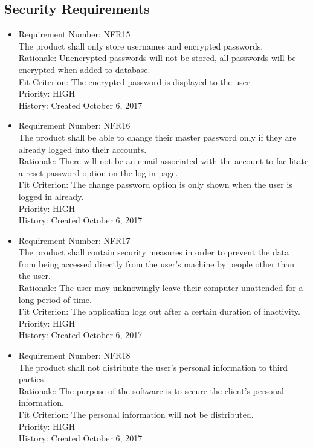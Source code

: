 \documentclass[12pt, titlepage]{article}
\begin{document}
\subsection{Security Requirements}
\begin{itemize}
	\item Requirement Number: NFR15\\
The product shall only store usernames and encrypted passwords.\\
Rationale: Unencrypted passwords will not be stored, all passwords will be encrypted when added to database.\\
Fit Criterion: The encrypted password is displayed to the user\\
Priority: HIGH\\
History: Created October 6, 2017

	\item Requirement Number: NFR16\\
The product shall be able to change their master password only if they are already logged into their accounts.\\
Rationale:  There will not be an email associated with the account to facilitate a reset password option on the log in page.\\
Fit Criterion: The change password option is only shown when the user is logged in already.\\
Priority: HIGH\\
History: Created October 6, 2017

	\item Requirement Number: NFR17\\
The product shall contain security measures in order to prevent the data from being accessed directly from the user’s machine by people other than the user.\\
Rationale: The user may unknowingly leave their computer unattended for a long period of time.\\
Fit Criterion: The application logs out after a certain duration of inactivity.\\
Priority: HIGH\\
History: Created October 6, 2017

	\item Requirement Number: NFR18\\
The product shall not distribute the user’s personal information to third parties.\\
Rationale: The purpose of the software is to secure the client’s personal information.\\
Fit Criterion: The personal information will not be distributed.\\
Priority: HIGH\\
History: Created October 6, 2017
	
\end{itemize}
\end{document}
